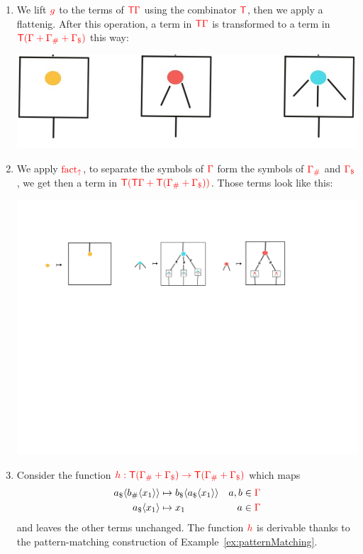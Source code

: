 \begin{example}
\begin{enumerate}
\begin{center}
\end{center}
\item We lift ${\color{red}{g}}$ to the terms of ${\color{red}{\mathsf T}} {\color{red}{\Gamma}}$ using the combinator ${\color{red}{\mathsf T}}$, then we apply a flattenig. After this operation, a term in ${\color{red}{\mathsf T}}{\color{red}{\Gamma}}$ is transformed to a term in ${\color{red}{{\color{red}{\mathsf T}}({\color{red}{\Gamma}}+{\color{red}{\Gamma}}_\#+{\color{red}{\Gamma}}_\$)}}$ this way:
\begin{center}
\includegraphics[scale=.15]{MyPic2.jpg}
\end{center}
\item We apply ${\color{red}{\mathrm{fact_{\uparrow}}}}$, to separate the symbols of ${\color{red}{\Gamma}}$ form the symbols of ${\color{red}{{\color{red}{\Gamma}}_\#}}$ and ${\color{red}{{\color{red}{\Gamma}}_\$}}$, we get then a term in ${\color{red}{{\color{red}{\mathsf T}}({\color{red}{\mathsf T}}{\color{red}{\Gamma}}+{\color{red}{\mathsf T}}({\color{red}{\Gamma}}_\#+{\color{red}{\Gamma}}_\$))}}$. Those terms look like this:
\begin{center}
\includegraphics[scale=.15]{MyPic3.jpg}
\end{center}
\item Consider the function ${\color{red}{h:{\color{red}{\mathsf T}}({\color{red}{\Gamma}}_\#+{\color{red}{\Gamma}}_\$)\to {\color{red}{\mathsf T}}({\color{red}{\Gamma}}_\#+{\color{red}{\Gamma}}_\$)}}$ which maps
\begin{align*}
a_\$\langle{b_\#\langle{x_1}\rangle}\rangle &\mapsto b_\$\langle{a_\$\langle{x_1}\rangle}\rangle&  a, b\in {\color{red}{\Gamma}}\\
a_\$\langle{x_1}\rangle & \mapsto  x_1&  a\in{\color{red}{\Gamma}}
\end{align*}
and leaves the other terms unchanged. 
The function ${\color{red}{h}}$ is derivable thanks to the pattern-matching construction of Example~\ref{ex:patternMatching}.


\end{enumerate}
\end{example}
